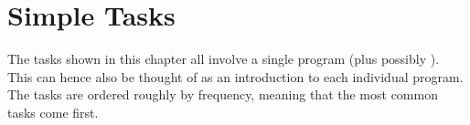 
\chapter{Simple Tasks}
\label{chap_simple}

The tasks shown in this chapter all involve a single \nutils{} program (plus
possibly \display). This can hence also be thought of as an introduction to
each individual program. The tasks are ordered roughly by frequency, meaning
that the most common tasks come first.















